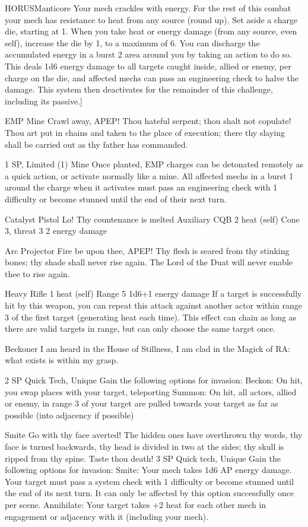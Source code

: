 \begin{mech}{HORUS}{Manticore}
{Your mech crackles with energy. For the rest of this combat your mech has resistance to heat from any source (round up). Set aside a charge die, starting at 1. When you take heat or energy damage (from any source, even self), increase the die by 1, to a maximum of 6. You can discharge the accumulated energy in a burst 2 area around you by taking an action to do so. This deals 1d6 energy damage to all targets caught inside, allied or enemy, per charge on the die, and affected mechs can pass an engineering check to halve the damage. This system then deactivates for the remainder of this challenge, including its passive.}]


EMP Mine
Crawl away, APEP! Thou hateful serpent; thou shalt not copulate! Thou art put in chains and taken to the place of execution; there thy slaying shall be carried out as thy father has commanded.

1 SP, Limited (1)
Mine
Once planted, EMP charges can be detonated remotely as a quick action, or activate normally like a mine. All affected mechs in a burst 1 around the charge when it activates must pass an engineering check with 1 difficulty or become stunned until the end of their next turn.

Catalyst Pistol
Lo! Thy countenance is melted
Auxiliary CQB
2 heat (self)
Cone 3, threat 3
2 energy damage

Arc Projector
Fire be upon thee, APEP! Thy flesh is seared from thy stinking bones; thy shade shall never rise again. The Lord of the Duat will never enable thee to rise again.

Heavy Rifle
1 heat (self)
Range 5
1d6+1 energy damage
If a target is successfully hit by this weapon, you can repeat this attack against another actor within range 3 of the first target (generating heat each time). This effect can chain as long as there are valid targets in range, but can only choose the same target once.

Beckoner
I am heard in the House of Stillness, I am clad in the Magick of RA: what exists is within my grasp.

2 SP
Quick Tech, Unique
Gain the following options for invasion:
Beckon: On hit, you swap places with your target, teleporting
Summon: On hit, all actors, allied or enemy, in range 3 of your target are pulled towards your target as far as possible (into adjacency if possible)

Smite
Go with thy face averted! The hidden ones have overthrown thy words, thy face is turned backwards, thy head is divided in two at the sides; thy skull is ripped from thy spine. Taste thou death!
3 SP
Quick tech, Unique
Gain the following options for invasion:
	Smite: Your mech takes 1d6 AP energy damage. Your target must pass a system check with 1 difficulty or become stunned until the end of its next turn. It can only be affected by this option successfully once per scene.
Annihilate: Your target takes +2 heat for each other mech in engagement or adjacency with it (including your mech).


\end{mech}
